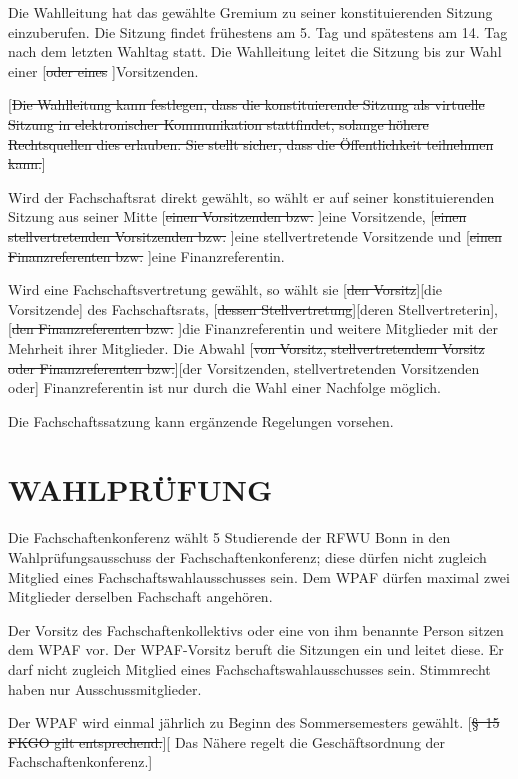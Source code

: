 \documentclass[%
draft,%
multilinesections%
]{fswo}
\newcommand\oldT[1]  {{\color{Gray}[\st{#1}]}}
\newcommand\newT[1]  {{\color{Green}[#1]}}
\newcommand\oldT[1]{}%
\newcommand\newT[1]{#1}
\newcommand\change[2]{\oldT{#1}\newT{#2}}
\begin{document}
\begin{contract}
Die Wahlleitung hat das gewählte Gremium zu seiner konstituierenden Sitzung einzuberufen.
Die Sitzung findet frühestens am 5. Tag und spätestens am 14. Tag nach dem letzten Wahltag statt.
Die Wahlleitung leitet die Sitzung bis zur Wahl einer \oldT{oder eines }Vorsitzenden.

\oldT{Die Wahlleitung kann festlegen, dass die konstituierende Sitzung als virtuelle Sitzung in elektronischer Kommunikation stattfindet, solange höhere Rechtsquellen dies erlauben.
Sie stellt sicher, dass die Öffentlichkeit teilnehmen kann.}

Wird der Fachschaftsrat direkt gewählt, so wählt er auf seiner konstituierenden Sitzung aus seiner Mitte \oldT{einen Vorsitzenden bzw. }eine Vorsitzende, \oldT{einen stellvertretenden Vorsitzenden bzw. }eine stellvertretende Vorsitzende und \oldT{einen Finanzreferenten bzw. }eine Finanzreferentin.

Wird eine Fachschaftsvertretung gewählt, so wählt sie \change{den Vorsitz}{die Vorsitzende} des Fachschaftsrats, \change{dessen Stellvertretung}{deren Stellvertreterin}, \oldT{den Finanzreferenten bzw. }die Finanzreferentin und weitere Mitglieder mit der Mehrheit ihrer Mitglieder.
Die Abwahl \change{von Vorsitz, stellvertretendem Vorsitz oder Finanzreferenten bzw.}{der Vorsitzenden, stellvertretenden Vorsitzenden oder} Finanzreferentin ist nur durch die Wahl einer Nachfolge möglich.

Die Fachschaftssatzung kann ergänzende Regelungen vorsehen.
\end{contract}

\section{WAHLPRÜFUNG}
\begin{contract}
Die Fachschaftenkonferenz wählt 5 Studierende der RFWU Bonn in den Wahlprüfungsausschuss der Fachschaftenkonferenz;
diese dürfen nicht zugleich Mitglied eines Fachschaftswahlausschusses sein.
Dem WPAF dürfen maximal zwei Mitglieder derselben Fachschaft angehören.

Der Vorsitz des Fachschaftenkollektivs oder eine von ihm benannte Person sitzen dem WPAF vor.
Der WPAF-Vorsitz beruft die Sitzungen ein und leitet diese.
Er darf nicht zugleich Mitglied eines Fachschaftswahlausschusses sein.
Stimmrecht haben nur Ausschussmitglieder.

Der WPAF wird einmal jährlich zu Beginn des Sommersemesters gewählt.
\change{\S~15 FKGO gilt entsprechend.}{%
Das Nähere regelt die Geschäftsordnung der Fachschaftenkonferenz.}
\end{contract}
\end{document}
